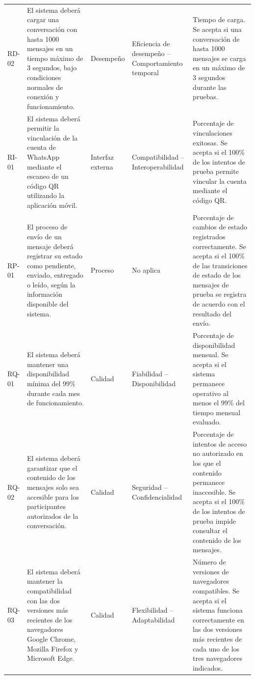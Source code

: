 \documentclass[12pt,a4paper,oneside]{article}
\begin{document}
\begin{longtable}{C{1.1cm} L{4.0cm} L{2.0cm} L{3.0cm} L{4.0cm}}
RD-02 &
El sistema deberá cargar una conversación con hasta 1000 mensajes en un tiempo máximo de 3 segundos, bajo condiciones normales de conexión y funcionamiento. &
Desempeño &
Eficiencia de desempeño -- Comportamiento temporal &
Tiempo de carga. Se acepta si una conversación de hasta 1000 mensajes se carga en un máximo de 3 segundos durante las pruebas. \\

RI-01 &
El sistema deberá permitir la vinculación de la cuenta de WhatsApp mediante el escaneo de un código QR utilizando la aplicación móvil. &
Interfaz externa &
Compatibilidad -- Interoperabilidad &
Porcentaje de vinculaciones exitosas. Se acepta si el 100\% de los intentos de prueba permite vincular la cuenta mediante el código QR. \\

RP-01 &
El proceso de envío de un mensaje deberá registrar su estado como pendiente, enviado, entregado o leído, según la información disponible del sistema. &
Proceso &
No aplica &
Porcentaje de cambios de estado registrados correctamente. Se acepta si el 100\% de las transiciones de estado de los mensajes de prueba se registra de acuerdo con el resultado del envío. \\

RQ-01 &
El sistema deberá mantener una disponibilidad mínima del 99\% durante cada mes de funcionamiento. &
Calidad &
Fiabilidad -- Disponibilidad &
Porcentaje de disponibilidad mensual. Se acepta si el sistema permanece operativo al menos el 99\% del tiempo mensual evaluado. \\

RQ-02 &
El sistema deberá garantizar que el contenido de los mensajes solo sea accesible para los participantes autorizados de la conversación. &
Calidad &
Seguridad -- Confidencialidad &
Porcentaje de intentos de acceso no autorizado en los que el contenido permanece inaccesible. Se acepta si el 100\% de los intentos de prueba impide consultar el contenido de los mensajes. \\

RQ-03 &
El sistema deberá mantener la compatibilidad con las dos versiones más recientes de los navegadores Google Chrome, Mozilla Firefox y Microsoft Edge. &
Calidad &
Flexibilidad -- Adaptabilidad &
Número de versiones de navegadores compatibles. Se acepta si el sistema funciona correctamente en las dos versiones más recientes de cada uno de los tres navegadores indicados. \\


\end{longtable}
\end{document}
